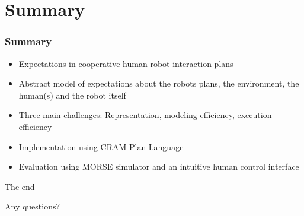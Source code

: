 \documentclass{beamer}
\begin{document}
\section{Summary}

\begin{frame}
  \frametitle<presentation>{Summary}

  \begin{itemize}
  \item Expectations in cooperative human robot interaction plans
  \item Abstract model of expectations about the robots plans, the environment, the human(s) and the robot itself
  \item Three main challenges: Representation, modeling efficiency, execution efficiency
  \item Implementation using CRAM Plan Language
  \item Evaluation using MORSE simulator and an intuitive human control interface
  \end{itemize}

\end{frame}

\begin{frame}{The end}
 \begin{center}
  Any questions?
\end{center}
\end{frame}
\end{document}
